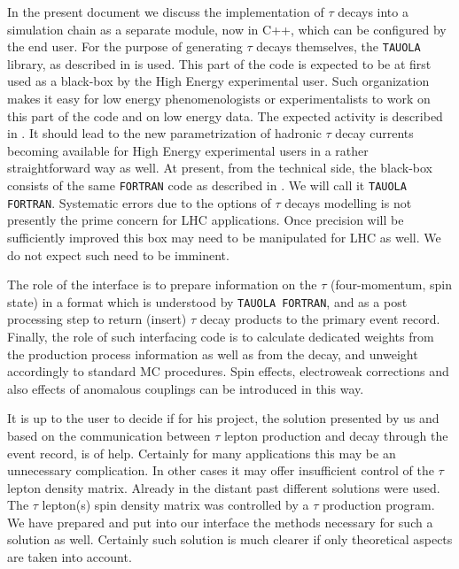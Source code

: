 \documentclass[]{Tauola_interface_design}
\begin{document}
In the present document we discuss the implementation of $\tau$ decays 
into a simulation chain as a separate module, now in C++, which can be configured
 by the end 
user. For the purpose of generating $\tau$ decays themselves, 
the {\tt TAUOLA}  library, as described
in \cite{Jadach:1990mz,Jezabek:1991qp,Jadach:1993hs} 
is used. This part of the code is expected to be at first used as
a black-box by the High Energy experimental user.  
 Such organization
 makes it
 easy for low energy phenomenologists or experimentalists to work on this part of the code and on low energy data. The expected
 activity is described in \cite{Actis:2010gg}. It should lead to the
new parametrization of hadronic $\tau$ decay currents  becoming available for  
High Energy experimental users in a rather straightforward way as well.
At present, from the technical side, the black-box consists of 
 the same {\tt FORTRAN} code  as described 
in \cite{Golonka:2003xt}. We will call it {\tt TAUOLA FORTRAN}.  
Systematic errors due to the options of $\tau$ decays modelling 
is not presently the prime concern for  LHC applications. Once precision 
will be sufficiently improved this box may need to be manipulated for LHC
as well. We do not expect such need to be imminent.

The role of the interface is to prepare information on the $\tau$ 
(four-momentum, spin state) in a format which is understood by 
{\tt TAUOLA FORTRAN}, and as a post processing step to return (insert) $\tau$ 
decay products to the primary event record.
Finally, the role of such interfacing code is to calculate dedicated
weights from the production process information as well as from the decay, 
and unweight accordingly to standard MC procedures. Spin effects, 
electroweak corrections and also effects of anomalous couplings can be 
introduced in this way.

It is up to the user to decide if for his project, the solution presented by us
and based
on the communication between  $\tau$ lepton production and decay through 
the event record, is of help. Certainly for many applications this may be an unnecessary
complication. In other cases it may offer insufficient
control of the $\tau$ lepton density matrix. Already in the distant past \cite{Jadach:1985ac,kkcpc:1999}  different solutions were used. The $\tau$ lepton(s) spin density matrix 
was controlled by a $\tau$ production program. We have prepared and put into our interface
the methods necessary for such a solution
 as well. Certainly such solution is much clearer
 if only theoretical aspects are taken into account.
 
\end{document}
